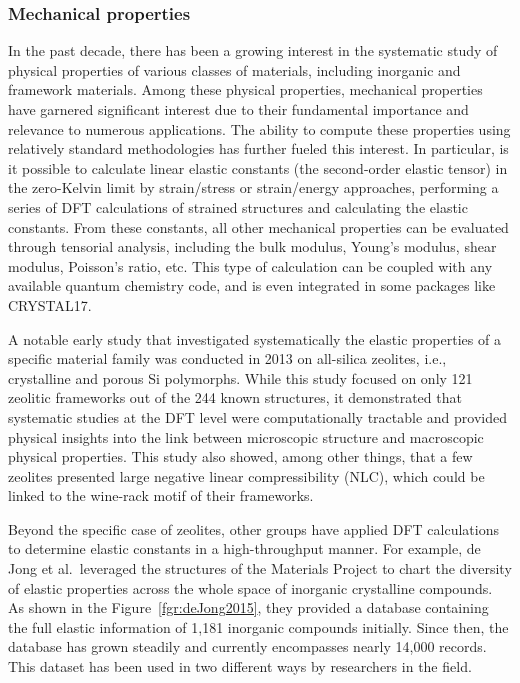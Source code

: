 \documentclass[main.tex]{subfiles}
\begin{document}
\subsubsection{Mechanical properties}

In the past decade, there has been a growing interest in the systematic study of physical properties of various classes of materials, including inorganic and framework materials. Among these physical properties, mechanical properties have garnered significant interest due to their fundamental importance and relevance to numerous applications. The ability to compute these properties using relatively standard methodologies has further fueled this interest. In particular, is it possible to calculate linear elastic constants (the second-order elastic tensor) in the zero-Kelvin limit by strain/stress or strain/energy approaches, performing a series of DFT calculations of strained structures and calculating the elastic constants. From these constants, all other mechanical properties can be evaluated through tensorial analysis,\autocite{Marmier_2010} including the bulk modulus, Young's modulus, shear modulus, Poisson's ratio, etc. This type of calculation can be coupled with any available quantum chemistry code,\autocite{Golesorkhtabar_2013} and is even integrated in some packages like CRYSTAL17.\autocite{Dovesi_2018}

A notable early study that investigated systematically the elastic properties of a specific material family was conducted in 2013 on all-silica zeolites,\autocite{Coudert_2013} i.e., crystalline and porous Si polymorphs. While this study focused on only 121 zeolitic frameworks out of the 244 known structures, it demonstrated that systematic studies at the DFT level were computationally tractable and provided physical insights into the link between microscopic structure and macroscopic physical properties. This study also showed, among other things, that a few zeolites presented large negative linear compressibility (NLC), which could be linked to the wine-rack motif of their frameworks.

Beyond the specific case of zeolites, other groups have applied DFT calculations to determine elastic constants in a high-throughput manner. For example, de Jong et al.\ leveraged the structures of the Materials Project\autocite{Matgenome, Jain_2013} to chart the diversity of elastic properties across the whole space of inorganic crystalline compounds.\autocite{deJong_2015} As shown in the Figure~\ref{fgr:deJong2015}, they provided a database containing the full elastic information of 1,181 inorganic compounds initially. Since then, the database has grown steadily and currently encompasses nearly 14,000 records.\autocite{MaterialsProject} This dataset has been used in two different ways by researchers in the field.
\end{document}
